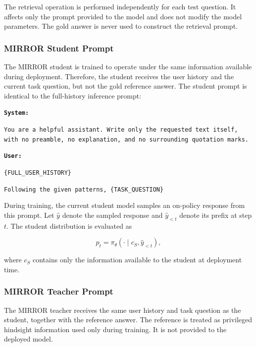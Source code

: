 \documentclass{article} %
\begin{document}
The retrieval operation is performed independently for each test question. It affects only the prompt provided to the model and does not modify the model parameters. The gold answer is never used to construct the retrieval prompt.

\subsubsection{MIRROR Student Prompt}

The MIRROR student is trained to operate under the same information available during deployment. Therefore, the student receives the user history and the current task question, but not the gold reference answer. The student prompt is identical to the full-history inference prompt:

\begin{tcolorbox}[
    colback=gray!5,
    colframe=black!45,
    title=MIRROR student prompt,
    breakable,
    left=3pt,
    right=3pt,
    top=3pt,
    bottom=3pt
]
\small
\texttt{\textbf{System:}}

\texttt{You are a helpful assistant. Write only the requested text itself, with no preamble, no explanation, and no surrounding quotation marks.}

\medskip

\texttt{\textbf{User:}}

\texttt{\{FULL\_USER\_HISTORY\}}

\texttt{Following the given patterns, \{TASK\_QUESTION\}}
\end{tcolorbox}

During training, the current student model samples an on-policy response from this prompt. Let $\hat{y}$ denote the sampled response and $\hat{y}_{<t}$ denote its prefix at step $t$. The student distribution is evaluated as

\begin{equation}
p_t
=
\pi_{\theta}
\left(
\cdot \mid
c_S,\hat{y}_{<t}
\right),
\end{equation}

where $c_S$ contains only the information available to the student at deployment time.

\subsubsection{MIRROR Teacher Prompt}

The MIRROR teacher receives the same user history and task question as the student, together with the reference answer. The reference is treated as privileged hindsight information used only during training. It is not provided to the deployed model.
\end{document}
